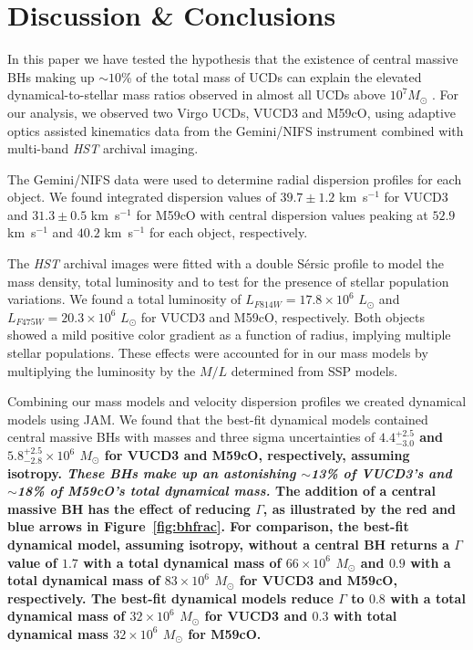 \documentclass{aastex}
\begin{document}
  
\section{Discussion \& Conclusions} \label{sec:concl}

In this paper we have tested the hypothesis that the existence of central massive BHs making up $\sim10$\% of the total mass of UCDs can explain the elevated dynamical-to-stellar mass ratios observed in almost all UCDs above $10^7 M_\odot$ \citep{hasegan05,mieske08,mieske13,seth14}. For our analysis, we observed two Virgo UCDs, VUCD3 and M59cO, using adaptive optics assisted kinematics data from the Gemini/NIFS instrument combined with multi-band \textit{HST} archival imaging.

The Gemini/NIFS data were used to determine radial dispersion profiles for each object. We found integrated dispersion values of $39.7 \pm 1.2$ km~s$^{-1}$ for VUCD3 and $31.3 \pm 0.5$ km~s$^{-1}$ for M59cO with central dispersion values peaking at $52.9$ km~s$^{-1}$ and $40.2$ km~s$^{-1}$ for each object, respectively. 

The \textit{HST} archival images were fitted with a double S\'ersic profile to model the mass density, total luminosity and to test for the presence of stellar population variations. We found a total luminosity of $L_{F814W} = 17.8 \times 10^6$ $L_\odot$ and $L_{F475W} = 20.3 \times 10^6$ $L_\odot$ for VUCD3 and M59cO, respectively. Both objects showed a mild positive color gradient as a function of radius, implying multiple stellar populations. These effects were accounted for in our mass models by multiplying the luminosity by the $M/L$ determined from SSP models. 

Combining our mass models and velocity dispersion profiles we created dynamical models using JAM. We found that the best-fit dynamical models contained central massive BHs with masses and three sigma uncertainties of \textbf{$4.4^{+2.5}_{-3.0}$ and $5.8^{+2.5}_{-2.8} \times 10^6$ $M_\odot$ for VUCD3 and M59cO, respectively, assuming isotropy. \textit{These BHs make up an astonishing $\sim$13\% of VUCD3's and $\sim$18\% of M59cO's total dynamical mass.} The addition of a central massive BH has the effect of reducing $\Gamma$, as illustrated by the red and blue arrows in Figure~\ref{fig:bhfrac}. For comparison, the best-fit dynamical model, assuming isotropy, without a central BH returns a $\Gamma$ value of $1.7$ with a total dynamical mass of $66 \times 10^6$ $M_\odot$ and $0.9$ with a total dynamical mass of $83 \times 10^6$ $M_\odot$ for VUCD3 and M59cO, respectively. The best-fit dynamical models reduce $\Gamma$ to $0.8$ with a total dynamical mass of $32 \times 10^6$ $M_\odot$ for VUCD3 and $0.3$ with total dynamical mass $32 \times 10^6$ $M_\odot$ for M59cO. }
\end{document}
